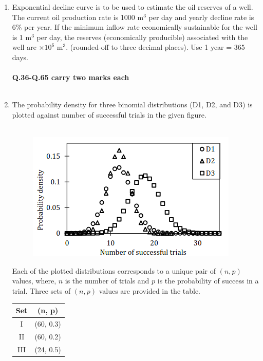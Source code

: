 \documentclass[12pt,a4paper]{article}
\begin{document}
\begin{enumerate}
\pagebreak

\item Exponential decline curve is to be used to estimate the oil reserves of a well. The current oil production rate is 1000 m$^3$ per day and yearly decline rate is 6\% per year. If the minimum inflow rate economically sustainable for the well is 1 m$^3$ per day, the reserves (economically producible) associated with the well are \underline{\hspace{2cm}} $\times 10^6$ m$^3$. (rounded-off to three decimal places). Use 1 year = 365 days.\hfill{}\\\\


{\large \textbf{Q.36-Q.65 carry two marks each}}\\\\

\item The probability density for three binomial distributions (D1, D2, and D3) is plotted against
number of successful trials in the given figure.\hfill{}\\\\


\begin{figure}[h!]
  \centering
  \includegraphics[width=0.5\columnwidth]{figs/pic8.png} 
\end{figure}

Each of the plotted distributions corresponds to a unique pair of $(n, p)$ values, where, $n$ is the number of trials and $p$ is the probability of success in a trial. Three sets of $(n, p)$ values are provided in the table.
\hfill{}

\begin{center}
\begin{tabular}{|c|c|}
\hline
Set & (n, p) \\
\hline
I & (60, 0.3) \\
II & (60, 0.2) \\
III & (24, 0.5) \\
\hline
\end{tabular}
\end{center}


\end{enumerate}
\end{document}
